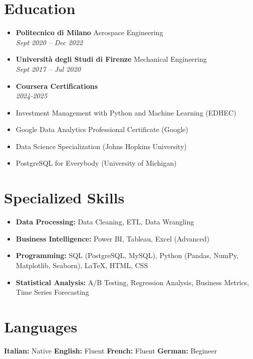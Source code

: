 \documentclass[letterpaper,10.5pt]{article}
\newcommand{\resumeEntry}[4]{
  \item\textbf{#1} \hfill #2\\
  \textit{#3} \hfill \textit{#4}
}
\begin{document}
\section*{Education}\vspace{-5pt}
\begin{itemize}[leftmargin=0.2in]
    \resumeEntry{Politecnico di Milano}{Aerospace Engineering}{Sept 2020 -- Dec 2022}{}
    \resumeEntry{Università degli Studi di Firenze}{Mechanical Engineering}{Sept 2017 -- Jul 2020}{}
    \resumeEntry{Coursera Certifications}{}{2024-2025}{}
\end{itemize}
\begin{multicols}{2}
    \small
    \begin{itemize}[leftmargin=0.4 in, label={-}]
        \item Investment Management with Python and Machine Learning (EDHEC)
        \item Google Data Analytics Professional Certificate (Google)
    \end{itemize}
    \begin{itemize}[leftmargin=0.3 in, label={-}]
        \item Data Science Specialization (Johns Hopkins University)
        \item PostgreSQL for Everybody (University of Michigan)
    \end{itemize}
\end{multicols}

\section*{Specialized Skills}\vspace{-15pt}
\begin{multicols}{2}
\begin{itemize}[leftmargin=0.2in]
    \item \textbf{Data Processing:} Data Cleaning, ETL, Data Wrangling
    \item \textbf{Business Intelligence:} Power BI, Tableau, Excel (Advanced)
    \item \textbf{Programming:} SQL (PostgreSQL, MySQL), Python (Pandas, NumPy, Matplotlib, Seaborn), LaTeX, HTML, CSS
    \item \textbf{Statistical Analysis:} A/B Testing, Regression Analysis, Business Metrics, Time Series Forecasting
\end{itemize}
\end{multicols}

\section*{Languages}\vspace{- 5 pt}
\textbf{Italian:} Native \hspace{20pt} \textbf{English:} Fluent \hspace{20pt} \textbf{French:} Fluent \hspace{20pt} \textbf{German:} Begineer
\end{document}
